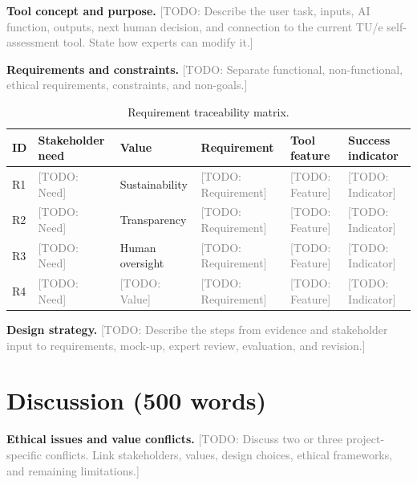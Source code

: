 \documentclass[11pt,a4paper]{article}
\newcommand{\placeholder}[1]{\textcolor{gray}{[TODO: #1]}}
\begin{document}
\textbf{Tool concept and purpose.}
\placeholder{Describe the user task, inputs, AI function, outputs, next human decision, and connection to the current TU/e self-assessment tool. State how experts can modify it.}

\textbf{Requirements and constraints.}
\placeholder{Separate functional, non-functional, ethical requirements, constraints, and non-goals.}

\begin{table}[htbp]
\centering
\caption{Requirement traceability matrix.}
\scriptsize
\begin{tabularx}{\textwidth}{@{}p{}p{}p{}XXX@{}}
\toprule
ID & Stakeholder need & Value & Requirement & Tool feature & Success indicator \\
\midrule
R1 & \placeholder{Need} & Sustainability & \placeholder{Requirement} & \placeholder{Feature} & \placeholder{Indicator} \\
R2 & \placeholder{Need} & Transparency & \placeholder{Requirement} & \placeholder{Feature} & \placeholder{Indicator} \\
R3 & \placeholder{Need} & Human oversight & \placeholder{Requirement} & \placeholder{Feature} & \placeholder{Indicator} \\
R4 & \placeholder{Need} & \placeholder{Value} & \placeholder{Requirement} & \placeholder{Feature} & \placeholder{Indicator} \\
\bottomrule
\end{tabularx}
\end{table}

\textbf{Design strategy.}
\placeholder{Describe the steps from evidence and stakeholder input to requirements, mock-up, expert review, evaluation, and revision.}

\section{Discussion (500 words)}

\textbf{Ethical issues and value conflicts.}
\placeholder{Discuss two or three project-specific conflicts. Link stakeholders, values, design choices, ethical frameworks, and remaining limitations.}
\end{document}
